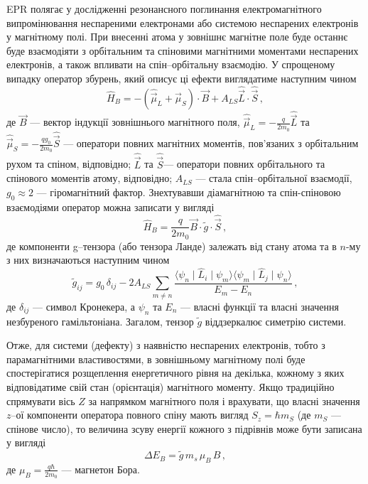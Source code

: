 \documentclass[10pt,a5paper,titlepage,oneside]{book}
\numberwithin{equation}{part}
\begin{document}
EPR полягає у дослідженні резонансного поглинання електромагнітного випромінювання неспареними 
електронами або системою неспарених електронів у магнітному полі.
При внесенні атома у зовнішнє магнітне поле буде 
останнє буде взаємодіяти з орбітальним та спіновими магнітними моментами
неспарених електронів, а також впливати на спін--орбітальну взаємодію.
У спрощеному випадку оператор збурень, який описує ці ефекти виглядатиме наступним чином
\begin{equation}
\hat{H}_B=-(\hat{\vec{\mu}}_L+\hat{\vec{\mu}}_S)\cdot\vec{B}+A_{LS}\hat{\vec{L}}\cdot\hat{\vec{S}}\,,
\end{equation}
де
$\vec{B}$ --- вектор індукції зовнішнього магнітного поля,
$\hat{\vec{\mu}}_L=-\frac{q}{2m_0}\hat{\vec{L}}$ та 
$\hat{\vec{\mu}}_S=-\frac{qg_0}{2m_0}\hat{\vec{S}}$
--- оператори повних магнітних моментів, пов'язаних з орбітальним рухом та спіном,
відповідно;
$\hat{\vec{L}}$ та $\hat{\vec{S}}$--- оператори повних орбітального та спінового моментів атому, відповідно;
$A_{LS}$ --- стала спін--орбітальної взаємодії,
$g_0\approx2$ --- гіромагнітний фактор.
Знехтувавши діамагнітною та спін-спіновою взаємодіями оператор можна записати у 
вигляді \cite{tuomisto2019}
\begin{equation}
\hat{H}_B=\frac{q}{2m_0}\vec{B}\cdot\tilde{g}\cdot\hat{\vec{S}}\,,
\end{equation}
де компоненти g--тензора (або тензора Ланде) залежать від стану
атома та в $n$-му з них визначаються наступним чином
\begin{equation}
\tilde{g}_{ij}=g_0\,\delta_{ij}-2A_{LS}\sum_{m\neq n}\frac{\langle\psi_n\mid\hat{L}_i\mid\psi_m\rangle
\langle\psi_m\mid\hat{L}_j\mid\psi_n\rangle}{E_m-E_n}\,,
\end{equation}
де 
$\delta_{ij}$ --- символ Кронекера, а
$\psi_n$ та $E_n$ --- власні функції та власні значення незбуреного гамільтоніана.
Загалом, тензор $\tilde{g}$ віддзеркалює симетрію системи.

Отже, для системи (дефекту) з наявністю неспарених електронів,
тобто з парамагнітними властивостями, в зовнішньому магнітному полі 
буде спостерігатися розщеплення енергетичного рівня на декілька, 
кожному з яких відповідатиме свій стан (орієнтація)
магнітного моменту.
Якщо традиційно спрямувати вісь $Z$ за напрямком магнітного поля і 
врахувати, що власні значення $z$--ої компоненти оператора повного спіну
мають вигляд $S_z=\hbar m_S$
(де $m_S$ --- спінове число), то величина зсуву енергії кожного з підрівнів може бути записана у вигляді
\begin{equation}
\Delta E_B=\tilde{g}\,m_s\, \mu_B\,B\,,
\end{equation}
де
$\mu_B=\frac{q\hbar}{2m_0}$ --- магнетон Бора.



\end{document}
